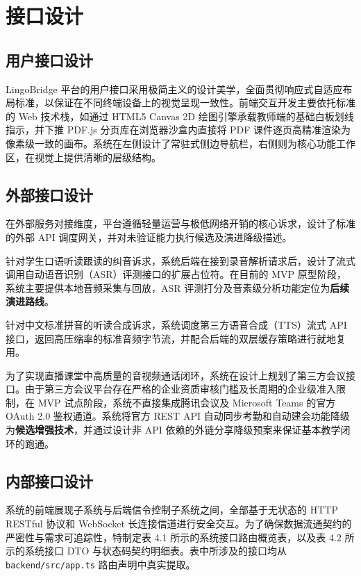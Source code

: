 \chapter{接口设计}

\section{用户接口设计}
LingoBridge 平台的用户接口采用极简主义的设计美学，全面贯彻响应式自适应布局标准，以保证在不同终端设备上的视觉呈现一致性。前端交互开发主要依托标准的 Web 技术栈，如通过 HTML5 Canvas 2D 绘图引擎承载教师端的基础白板划线指示，并下推 PDF.js 分页库在浏览器沙盒内直接将 PDF 课件逐页高精准渲染为像素级一致的画布。系统在左侧设计了常驻式侧边导航栏，右侧则为核心功能工作区，在视觉上提供清晰的层级结构。

\section{外部接口设计}
在外部服务对接维度，平台遵循轻量运营与极低网络开销的核心诉求，设计了标准的外部 API 调度网关，并对未验证能力执行候选及演进降级描述。

针对学生口语听读跟读的纠音诉求，系统后端在接到录音解析请求后，设计了流式调用自动语音识别（ASR）评测接口的扩展占位符。在目前的 MVP 原型阶段，系统主要提供本地音频采集与回放，ASR 评测打分及音素级分析功能定位为\textbf{后续演进路线}。

针对中文标准拼音的听读合成诉求，系统调度第三方语音合成（TTS）流式 API 接口，返回高压缩率的标准音频字节流，并配合后端的双层缓存策略进行就地复用。

为了实现直播课堂中高质量的音视频通话闭环，系统在设计上规划了第三方会议接口。由于第三方会议平台存在严格的企业资质审核门槛及长周期的企业级准入限制，在 MVP 试点阶段，系统不直接集成腾讯会议及 Microsoft Teams 的官方 OAuth 2.0 鉴权通道。系统将官方 REST API 自动同步考勤和自动建会功能降级为\textbf{候选增强技术}，并通过设计非 API 依赖的外链分享降级预案来保证基本教学闭环的跑通。

\section{内部接口设计}
系统的前端展现子系统与后端信令控制子系统之间，全部基于无状态的 HTTP RESTful 协议和 WebSocket 长连接信道进行安全交互。为了确保数据流通契约的严密性与需求可追踪性，特制定表 4.1 所示的系统接口路由概览表，以及表 4.2 所示的系统接口 DTO 与状态码契约明细表。表中所涉及的接口均从 \texttt{backend/src/app.ts} 路由声明中真实提取。

